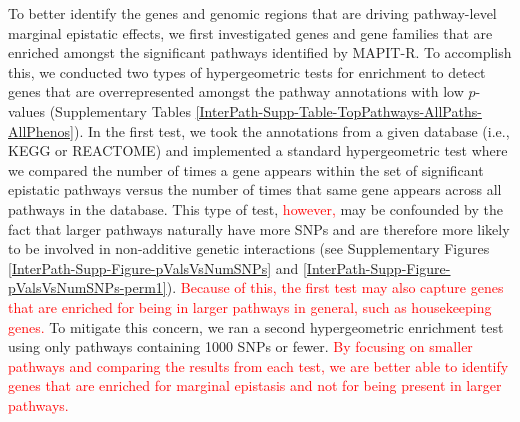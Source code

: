 \documentclass[10pt]{article}
\begin{document}
To better identify the genes and genomic regions that are driving pathway-level marginal epistatic effects, we first investigated genes and gene families that are enriched amongst the significant pathways identified by MAPIT-R. To accomplish this, we conducted two types of hypergeometric tests for enrichment to detect genes that are overrepresented amongst the pathway annotations with low $p$-values (Supplementary Tables \ref{InterPath-Supp-Table-TopPathways-AllPaths-AllPhenos}). In the first test, we took the annotations from a given database (i.e., KEGG or REACTOME) and implemented a standard hypergeometric test where we compared the number of times a gene appears within the set of significant epistatic pathways versus the number of times that same gene appears across all pathways in the database. This type of test, \textcolor{red}{however,} may be confounded by the fact that larger pathways naturally have more SNPs and are therefore more likely to be involved in non-additive genetic interactions (see Supplementary Figures \ref{InterPath-Supp-Figure-pValsVsNumSNPs} and \ref{InterPath-Supp-Figure-pValsVsNumSNPs-perm1}). \textcolor{red}{Because of this, the first test may also capture genes that are enriched for being in larger pathways in general, such as housekeeping genes.} To mitigate this concern, we ran a second hypergeometric enrichment test using only pathways containing 1000 SNPs or fewer. \textcolor{red}{By focusing on smaller pathways and comparing the results from each test, we are better able to identify genes that are enriched for marginal epistasis and not for being present in larger pathways.} 
\end{document}

